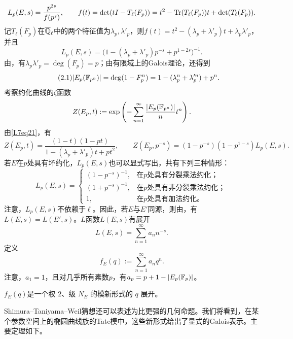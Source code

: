 \[L_p(E,s)=\frac{p^{2s}}{f(p^s)},\qquad f(t)=\det(tI-T_\ell(F_p))=t^2-\operatorname{Tr}(T_\ell(F_p))t+\det(T_\ell(F_p)).\]
记$T_\ell(F_p)$在$\overline{\mathbb{Q}}_\ell$中的两个特征值为$\lambda_p,\lambda'_p$，则$f(t)=t^2-(\lambda_p+\lambda'_p)t+\lambda_p\lambda'_p$，并且
\[L_p(E,s)=\bigl(1-(\lambda_p+\lambda'_p)p^{-s}+p^{1-2s}\bigr)^{-1}.\]
由，有$\lambda_p\lambda'_p=\deg(F_p)=p$；由有限域上的Galois理论，还得到
\begin{equation}\tag{2.1}\label{L7eq21}
|E_p(\mathbb{F}_{p^n})|=\deg(1-F_p^n)=1-(\lambda_p^n+\lambda_p'^n)+p^n.
\end{equation}
考察约化曲线的$\zeta$函数
\[Z(E_p,t):=\exp\left(-\sum_{n=1}^\infty\frac{|E_p(\mathbb{F}_{p^n})|}{n}t^n\right).\]
由\eqref{L7eq21}，有
\[Z(E_p,t)=\frac{(1-t)(1-pt)}{1-(\lambda_p+\lambda'_p)t+pt^2},\qquad Z(E_p,p^{-s})=(1-p^{-s})(1-p^{1-s})L_p(E,s).\]
若$E$在$p$处具有坏约化，$L_p(E,s)$也可以显式写出，共有下列三种情形：
\[L_p(E,s)=\begin{cases}(1-p^{-s})^{-1},&\text{在$p$处具有分裂乘法约化；}\\(1+p^{-s})^{-1},&\text{在$p$处具有非分裂乘法约化；}\\1,&\text{在$p$处具有加法约化。}\end{cases}\]
注意，$L_p(E,s)$不依赖于$\ell$。因此，若$E$与$E'$同源，则由，有$L(E,s)=L(E',s)$。$L$函数$L(E,s)$有展开
\[L(E,s)=\sum_{n=1}^\infty a_n n^{-s}.\]
定义
\[f_E(q):=\sum_{n=1}^\infty a_nq^n.\]
注意，$a_1=1$，且对几乎所有素数$p$，有$a_p=p+1-|E_p(\mathbb{F}_p)|$。
\begin{theorem}\label{L7S2O9}
$f_E(q)$是一个权 $2$、级 $N_E$ 的模新形式的 $q$ 展开。
\end{theorem}
Shimura--Taniyama--Weil猜想还可以表述为比更强的几何命题。我们将看到，在某个参数空间上的椭圆曲线族的Tate模中，这些新形式给出了显式的Galois表示。主要定理如下。

